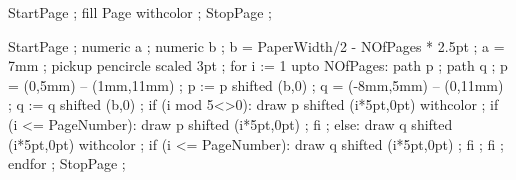 


\definecolor [background]       [s=.9]
\definecolor [darkgray]	        [s=.3]
\definecolor [lightgray]        [s=.7]
\definecolor [myred]            [r=.5]
\definecolor [Item]             [r=.5]


StartPage ;
fill Page withcolor  ;
StopPage ;
\stopuniqueMPgraphic 

StartPage ;
numeric a ;
numeric b ;
b = PaperWidth/2 - NOfPages * 2.5pt ;
a = 7mm ;
pickup pencircle scaled 3pt ;
for i := 1 upto NOfPages:
	path p ;
	path q ;
	p = (0,5mm) -- (1mm,11mm) ;
	p := p shifted (b,0) ;
	q = (-8mm,5mm) -- (0,11mm) ;
	q := q shifted (b,0) ;
	if (i mod 5<>0):
		draw p shifted (i*5pt,0pt) withcolor  ;
		if (i <= PageNumber):
			draw p shifted (i*5pt,0pt) ;
		fi ;
	else:
		draw q shifted (i*5pt,0pt) withcolor  ;
		if (i <= PageNumber):
			draw q shifted (i*5pt,0pt) ;
		fi ;
	fi ;
endfor ;
StopPage ;
\stopuseMPgraphic






\lecback{\setuplayout[header=2.2cm]\setupbackgrounds[page][background={lecbackground,scratchcounter,slidetitle}]}
\titback{\setuplayout[header=.5cm]\setupbackgrounds[page][background=lecbackground]}
\picback{\setuplayout[header=.5cm]\setupbackgrounds[page][background={lecbackground,scratchcounter}]}
\noback{\setupbackgrounds[page][background=nobackground]}

